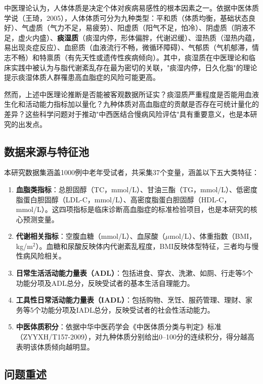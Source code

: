 \documentclass[12pt,a4paper]{ctexart}
\begin{document}
中医理论认为，人体体质是决定个体对疾病易感性的根本因素之一。依据中医体质学说（王琦，2005），人体体质可分为九种类型：平和质（体质均衡，基础状态良好）、气虚质（气力不足，易疲劳）、阳虚质（阳气不足，怕冷）、阴虚质（阴液不足，虚火内盛）、\textbf{痰湿质}（痰湿内停，形体偏胖，代谢迟缓）、湿热质（湿热内蕴，易出现炎症反应）、血瘀质（血液流行不畅，微循环障碍）、气郁质（气机郁滞，情志不畅）和特禀质（有先天性或遗传性疾病倾向）。其中，痰湿质在中医理论和临床实践中被认为与脂代谢紊乱存在最为密切的关联，"痰湿内停，日久化脂"的理论提示痰湿体质人群罹患高血脂症的风险可能更高。

然而，上述中医理论推断是否能被客观数据所证实？痰湿质严重程度是否能用血液生化和活动能力指标加以量化？九种体质对高血脂症的贡献是否存在可统计量化的差异？这些科学问题对于推动"中西医结合慢病风险评估"具有重要意义，也是本研究的出发点。

\subsection{数据来源与特征池}

本研究数据集涵盖1000例中老年受试者，共采集37个变量，涵盖以下五大类特征：

\begin{enumerate}[label=(\arabic*)]
\item \textbf{血脂类指标}：总胆固醇（TC，mmol/L）、甘油三酯（TG，mmol/L）、低密度脂蛋白胆固醇（LDL-C，mmol/L）、高密度脂蛋白胆固醇（HDL-C，mmol/L）。这四项指标是临床诊断高血脂症的标准检验项目，也是本研究的核心预测变量。
\item \textbf{代谢相关指标}：空腹血糖（mmol/L）、血尿酸（$\mu$mol/L）、体重指数（BMI，kg/m$^2$）。血糖和尿酸反映体内代谢紊乱程度，BMI反映体型特征，三者均与慢性病风险相关。
\item \textbf{日常生活活动能力量表（ADL）}：包括进食、穿衣、洗漱、如厕、行走等5个功能分项及ADL总分，反映受试者的基本生活自理能力。
\item \textbf{工具性日常活动能力量表（IADL）}：包括购物、烹饪、服药管理、理财、家务等5个功能分项及IADL总分，反映受试者的社会性活动能力。
\item \textbf{中医体质积分}：依据中华中医药学会《中医体质分类与判定》标准（ZYYXH/T157-2009），对九种体质分别给出0--100分的连续积分，得分越高表明该体质倾向越明显。
\end{enumerate}

\subsection{问题重述}
\end{document}

